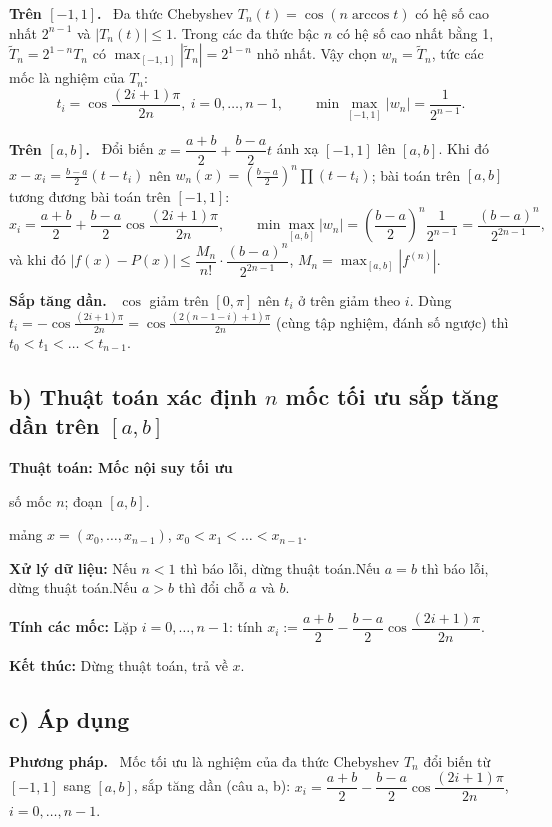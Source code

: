 \documentclass[11pt,a4paper]{article}
\newenvironment{thuattoan}[1]
  {\par\medskip\noindent\textbf{Thuật toán: #1}\begin{description}[style=standard,align=left,leftmargin=4.3em,labelwidth=3.9em,labelsep=0.4em,itemsep=1pt,topsep=3pt,font=\normalfont\bfseries]}
  {\end{description}}
\newcommand{\pp}[1]{\par\smallskip\noindent\textbf{#1}\ }
\begin{document}
\pp{Trên $[-1,1]$.} Đa thức Chebyshev $T_n(t)=\cos(n\arccos t)$ có hệ số cao nhất $2^{n-1}$ và $|T_n(t)|\le1$. Trong các đa thức bậc $n$ có hệ số cao nhất bằng 1, $\tilde T_n=2^{1-n}T_n$ có $\max_{[-1,1]}|\tilde T_n|=2^{1-n}$ nhỏ nhất. Vậy chọn $w_n=\tilde T_n$, tức các mốc là nghiệm của $T_n$:
\[ \boxed{t_i=\cos\frac{(2i+1)\pi}{2n},\ i=0,\dots,n-1,\qquad \min\max_{[-1,1]}|w_n|=\frac{1}{2^{n-1}}.} \]

\pp{Trên $[a,b]$.} Đổi biến $x=\dfrac{a+b}{2}+\dfrac{b-a}{2}t$ ánh xạ $[-1,1]$ lên $[a,b]$. Khi đó $x-x_i=\frac{b-a}{2}(t-t_i)$ nên $w_n(x)=\left(\frac{b-a}{2}\right)^n\prod(t-t_i)$; bài toán trên $[a,b]$ tương đương bài toán trên $[-1,1]$:
\[ \boxed{x_i=\frac{a+b}{2}+\frac{b-a}{2}\cos\frac{(2i+1)\pi}{2n},\qquad \min\max_{[a,b]}|w_n|=\left(\frac{b-a}{2}\right)^n\frac{1}{2^{n-1}}=\frac{(b-a)^n}{2^{2n-1}},} \]
và khi đó $|f(x)-P(x)|\le\dfrac{M_n}{n!}\cdot\dfrac{(b-a)^n}{2^{2n-1}}$, $M_n=\max_{[a,b]}|f^{(n)}|$.

\pp{Sắp tăng dần.} $\cos$ giảm trên $[0,\pi]$ nên $t_i$ ở trên giảm theo $i$. Dùng $t_i=-\cos\frac{(2i+1)\pi}{2n}=\cos\frac{(2(n-1-i)+1)\pi}{2n}$ (cùng tập nghiệm, đánh số ngược) thì $t_0<t_1<\dots<t_{n-1}$.

\subsection{b) Thuật toán xác định $n$ mốc tối ưu sắp tăng dần trên $[a,b]$}
\begin{thuattoan}{Mốc nội suy tối ưu}
\item[Input:] số mốc $n$; đoạn $[a,b]$.
\item[Output:] mảng $x=(x_0,\dots,x_{n-1})$, $x_0<x_1<\dots<x_{n-1}$.
\item[Bước 0:] \textbf{Xử lý dữ liệu:} Nếu $n<1$ thì báo lỗi, dừng thuật toán.\newline Nếu $a=b$ thì báo lỗi, dừng thuật toán.\newline Nếu $a>b$ thì đổi chỗ $a$ và $b$.
\item[Bước 1:] \textbf{Tính các mốc:} Lặp $i=0,\dots,n-1$: tính $x_i:=\dfrac{a+b}{2}-\dfrac{b-a}{2}\cos\dfrac{(2i+1)\pi}{2n}$.
\item[Bước 2:] \textbf{Kết thúc:} Dừng thuật toán, trả về $x$.
\end{thuattoan}

\subsection{c) Áp dụng}
\pp{Phương pháp.} Mốc tối ưu là nghiệm của đa thức Chebyshev $T_n$ đổi biến từ $[-1,1]$ sang $[a,b]$, sắp tăng dần (câu a, b): $x_i=\dfrac{a+b}{2}-\dfrac{b-a}{2}\cos\dfrac{(2i+1)\pi}{2n}$, $i=0,\dots,n-1$.
\end{document}
